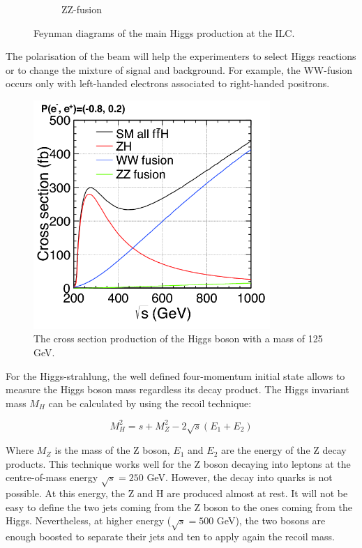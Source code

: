 \begin{figure}
\begin{subfigure}[t]{0.3\textwidth}
            \caption{ZZ-fusion}
            \label{fig:ZZ-fusion}
        \end{subfigure}
        \caption{Feynman diagrams of the main Higgs production at the ILC\cite{Asner2013}\cite{tian}.}
        \label{fig:higgsProduction}
    \end{figure}    
    
    The polarisation of the beam will help the experimenters to select Higgs reactions or to change the mixture of signal and background.
    For example, the WW-fusion occurs only with left-handed electrons associated to right-handed positrons. 

    
    \begin{figure}[h]
      \centering
      \includegraphics[width = 0.8\textwidth]{Pictures/Higgs/higgs_xsec_P-8_3.png}
      \caption{The cross section production of the Higgs boson with a mass of 125 GeV\cite{Asner2013}.}
      \label{fig:higgsXsec}
    \end{figure}

    For the Higgs-strahlung, the well defined four-momentum initial state allows to measure the Higgs boson mass regardless its decay product.
    The Higgs invariant mass $M_H$ can be calculated by using the recoil technique:

    \begin{equation}
      M^2_H = s + M^2_Z - 2 \sqrt{s}\left(E_{1} + E_{2}\right)
    \end{equation}

    Where $M_Z$ is the mass of the Z boson, $E_1$ and $E_2$ are the energy of the Z decay products. 
    This technique works well for the Z boson decaying into leptons at the centre-of-mass energy $\sqrt{s} = 250$ GeV.
    However, the decay into quarks is not possible. 
    At this energy, the Z and H are produced almost at rest.
    It will not be easy to define the two jets coming from the Z boson to the ones coming from the Higgs.
    Nevertheless, at higher energy ($\sqrt{s} = 500$ GeV), the two bosons are enough boosted to separate their jets and ten to apply again the recoil mass.

